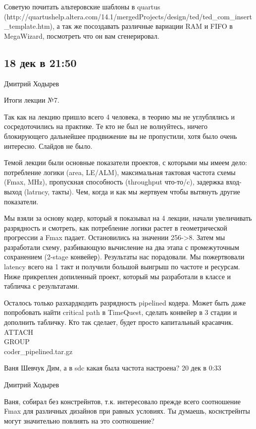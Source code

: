 \documentclass[a4paper, 12pt]{extarticle}
\begin{document}
Советую почитать альтеровские шаблоны в quartus (http://quartushelp.altera.com/14.1/mergedProjects/design/ted/ted_com_insert_template.htm), а так же посоздавать различные вариации RAM и FIFO в MegaWizard, посмотреть что он вам сгенерировал.




\subsection{18 дек в 21:50}
Дмитрий Ходырев

Итоги лекции №7.

Так как на лекцию пришло всего 4 человека, в теорию мы не углублялись и сосредоточились на практике. Те кто не был не волнуйтесь, ничего блокирующего дальнейшее продвижение вы не пропустили, хотя было очень интересно. Слайдов не было.

Темой лекции были основные показатели проектов, с которыми мы имеем дело: потребление логики (area, LE/ALM), максимальная тактовая частота схемы (Fmax, MHz), пропускная способность (throughput что-то/c), задержка вход-выход (latrncy, такты). Чем, когда и как мы жертвуем чтобы вытянуть другие показатели.

Мы взяли за основу кодер, который я показывал на 4 лекции, начали увеличивать разрядность и смотреть, как потребление логики растет в геометрической прогрессии а Fmax падает. Остановились на значении 256->8. Затем мы разработали схему, разбивающую вычисление на два этапа с промежуточным сохранением (2-stage конвейер). Результаты нас порадовали. Мы пожертвовали latency всего на 1 такт и получили большой выигрыш по частоте и ресурсам. Ниже прикреплен допиленный проект, который мы разработали в классе и табличка с результатами.

Осталось только разхардкодить разрядность pipelined кодера. Может быть даже попробовать найти critical path в TimeQuest, сделать конвейер в 3 стадии и дополнить табличку. Кто так сделает, будет просто капитальный красавчик.
ATTACH\\GROUP\\coder_pipelined.tar.gz


Ваня Шевчук
Дим, а в sdc какая была частота настроена?
20 дек в 0:33

Дмитрий Ходырев

Ваня, собирал без констрейнтов, т.к. интересовало прежде всего соотношение Fmax для различных дизайнов при равных условиях. Ты думаешь, коснстрейнты могут значительно повлиять на это соотношение?
\end{document}
